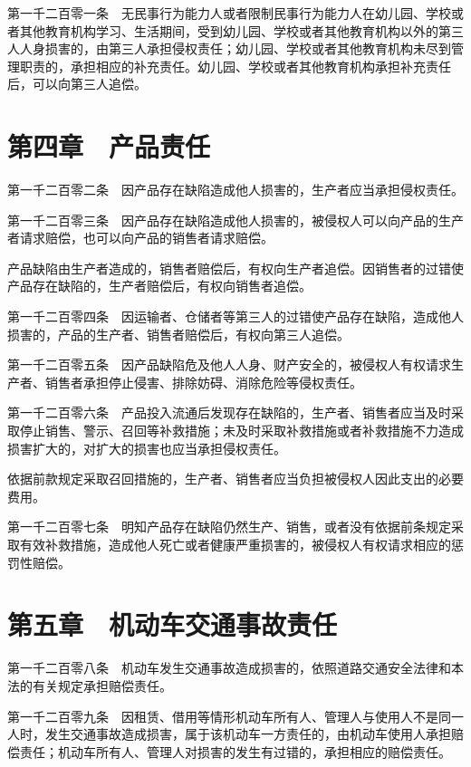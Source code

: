 \documentclass[UTF8,12pt,a4paper]{ctexbook}
\begin{document}
第一千二百零一条　无民事行为能力人或者限制民事行为能力人在幼儿园、学校或者其他教育机构学习、生活期间，受到幼儿园、学校或者其他教育机构以外的第三人人身损害的，由第三人承担侵权责任；幼儿园、学校或者其他教育机构未尽到管理职责的，承担相应的补充责任。幼儿园、学校或者其他教育机构承担补充责任后，可以向第三人追偿。

\section*{第四章　产品责任}

第一千二百零二条　因产品存在缺陷造成他人损害的，生产者应当承担侵权责任。

第一千二百零三条　因产品存在缺陷造成他人损害的，被侵权人可以向产品的生产者请求赔偿，也可以向产品的销售者请求赔偿。

产品缺陷由生产者造成的，销售者赔偿后，有权向生产者追偿。因销售者的过错使产品存在缺陷的，生产者赔偿后，有权向销售者追偿。

第一千二百零四条　因运输者、仓储者等第三人的过错使产品存在缺陷，造成他人损害的，产品的生产者、销售者赔偿后，有权向第三人追偿。

第一千二百零五条　因产品缺陷危及他人人身、财产安全的，被侵权人有权请求生产者、销售者承担停止侵害、排除妨碍、消除危险等侵权责任。

第一千二百零六条　产品投入流通后发现存在缺陷的，生产者、销售者应当及时采取停止销售、警示、召回等补救措施；未及时采取补救措施或者补救措施不力造成损害扩大的，对扩大的损害也应当承担侵权责任。

依据前款规定采取召回措施的，生产者、销售者应当负担被侵权人因此支出的必要费用。

第一千二百零七条　明知产品存在缺陷仍然生产、销售，或者没有依据前条规定采取有效补救措施，造成他人死亡或者健康严重损害的，被侵权人有权请求相应的惩罚性赔偿。

\section*{第五章　机动车交通事故责任}

第一千二百零八条　机动车发生交通事故造成损害的，依照道路交通安全法律和本法的有关规定承担赔偿责任。

第一千二百零九条　因租赁、借用等情形机动车所有人、管理人与使用人不是同一人时，发生交通事故造成损害，属于该机动车一方责任的，由机动车使用人承担赔偿责任；机动车所有人、管理人对损害的发生有过错的，承担相应的赔偿责任。
\end{document}
